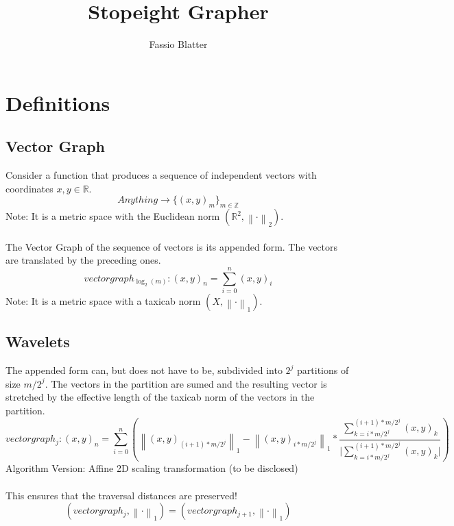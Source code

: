 \documentclass{report}
\newcommand\norm[1]{\left\lVert#1\right\rVert}
\begin{document}
\title{Stopeight Grapher}
\author{Fassio Blatter}
\maketitle

\chapter{Definitions}
\section{Vector Graph}
Consider a function that produces a sequence of independent vectors with coordinates $x,y \in \mathbb{R}$.
\begin{equation}
Anything \rightarrow \{(x,y)_{m}\}_{m \in \mathbb{Z}}
\end{equation}
Note: It is a metric space with the Euclidean norm $(\mathbb{R}^2,\norm{\cdot}_2)$.\\\\
The Vector Graph of the sequence of vectors is its appended form. The vectors are translated by the preceding ones.\\
\begin{equation}
vectorgraph_{\log_{2}(m)}: (x,y)_{n}=\sum_{i=0}^{n} (x,y)_{i}
\end{equation}
Note: It is a metric space with a taxicab norm $(X,\norm{\cdot}_1)$.
\section{Wavelets}
The appended form can, but does not have to be, subdivided into $2^j$ partitions of size $m/2^j$. The vectors in the partition are sumed and the resulting vector is stretched by the effective length of the taxicab norm of the vectors in the partition.
\begin{equation}
vectorgraph_{j}:(x,y)_{n}=\sum_{i=0}^{n} (\norm{(x,y)_{(i+1)*m/2^j}}_{1} - \norm{(x,y)_{i*m/2^j}}_{1} * \frac{\sum_{k=i*m/2^j}^{(i+1)*m/2^j} (x,y)_{k}}{\vert \sum_{k=i*m/2^j}^{(i+1)*m/2^j} (x,y)_{k} \vert})
\end{equation}
Algorithm Version: Affine 2D scaling transformation (to be disclosed)\\\\
This ensures that the traversal distances are preserved!
\begin{equation}
(vectorgraph_{j},\norm{\cdot}_{1})=(vectorgraph_{j+1},\norm{\cdot}_{1})
\end{equation}
\end{document}
